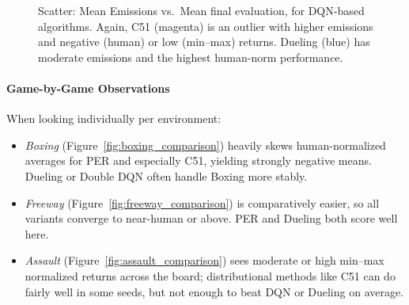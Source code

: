 \begin{figure}
	\centering
	\quad
	\caption{Scatter: Mean Emissions vs.\ Mean final evaluation, for DQN-based algorithms. 
		Again, C51 (magenta) is an outlier with higher emissions and negative (human) or low (min--max) returns. 
		Dueling (blue) has moderate emissions and the highest human-norm performance.}
	\label{fig:dqn_scatter_mean_mean}
\end{figure}

\paragraph{Game-by-Game Observations}
When looking individually per environment:
\begin{itemize}
	\item \emph{Boxing} (Figure~\ref{fig:boxing_comparison}) heavily skews human-normalized averages for PER and especially C51, 
	yielding strongly negative means. 
	Dueling or Double DQN often handle Boxing more stably.
	\item \emph{Freeway} (Figure~\ref{fig:freeway_comparison}) is comparatively easier, so all variants converge to near-human or above. 
	PER and Dueling both score well here. 
	\item \emph{Assault} (Figure~\vref{fig:assault_comparison}) sees moderate or high min--max normalized returns across the board; 
	distributional methods like C51 can do fairly well in some seeds, but not enough to beat DQN or Dueling on average.
\end{itemize}

